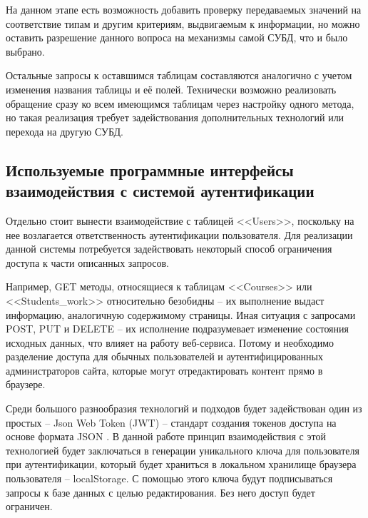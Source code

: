 
На данном этапе есть возможность добавить проверку передаваемых значений на соответствие типам и другим критериям, выдвигаемым к информации, но можно оставить разрешение данного вопроса на механизмы самой СУБД, что и было выбрано.


Остальные запросы к оставшимся таблицам составляются аналогично с учетом изменения названия таблицы и её полей.
Технически возможно реализовать обращение сразу ко всем имеющимся таблицам через настройку одного метода, но такая реализация требует задействования дополнительных технологий или перехода на другую СУБД.


\subsection{Используемые программные интерфейсы взаимодействия с системой аутентификации}

Отдельно стоит вынести взаимодействие с таблицей <<Users>>, поскольку на нее возлагается ответственность аутентификации пользователя.
Для реализации данной системы потребуется задействовать некоторый способ ограничения доступа к части описанных запросов.

Например, GET методы, относящиеся к таблицам <<Courses>> или <<Students\_work>> относительно безобидны -- их выполнение выдаст информацию, аналогичную содержимому страницы.
Иная ситуация с запросами POST, PUT и DELETE -- их исполнение подразумевает изменение состояния исходных данных, что влияет на работу веб-сервиса.
Потому и необходимо разделение доступа для обычных пользователей и аутентифицированных администраторов сайта, которые могут отредактировать контент прямо в браузере.

Среди большого разнообразия технологий и подходов будет задействован один из простых -- Json Web Token (JWT) \cite{jwt} -- стандарт создания токенов доступа на основе формата JSON \cite{wiki-json}. 
В данной работе принцип взаимодействия с этой технологией будет заключаться в генерации уникального ключа для пользователя при аутентификации, который будет храниться в локальном хранилище браузера пользователя -- localStorage.
С помощью этого ключа будут подписываться запросы к базе данных с целью редактирования.
Без него доступ будет ограничен.

